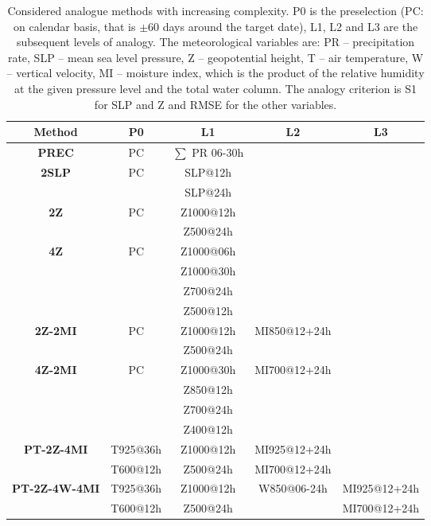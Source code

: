 \documentclass[twocol]{ametsoc}
\begin{document}
\begin{table*}[t]
	\caption{Considered analogue methods with increasing complexity. P0 is the preselection (PC: on calendar basis, that is $\pm 60$ days around the target date), L1, L2 and L3 are the subsequent levels of analogy. The meteorological variables are: PR -- precipitation rate, SLP -- mean sea level pressure, Z -- geopotential height, T -- air temperature, W -- vertical velocity, MI -- moisture index, which is the product of the relative humidity at the given pressure level and the total water column. The analogy criterion is S1 for SLP and Z and RMSE for the other variables.}
	\begin{center}
		\begin{tabular}{ccccc}
			\hline
			\textbf{Method} & \textbf{P0} & \textbf{L1} & \textbf{L2} & \textbf{L3} \\ 
			\hline 
			\textbf{PREC} & PC & $\sum$ PR 06-30h && \\
			\hline 
			\multirow{2}{*}{\textbf{2SLP}} & \multirow{2}{*}{PC} & SLP@12h && \\
			&& SLP@24h && \\
			\hline 
			\multirow{2}{*}{\textbf{2Z}} & \multirow{2}{*}{PC} & Z1000@12h && \\
			 && Z500@24h && \\
	 		\hline 
			\multirow{4}{*}{\textbf{4Z}} & \multirow{4}{*}{PC} & Z1000@06h && \\
			 && Z1000@30h && \\
			 && Z700@24h && \\
			 && Z500@12h && \\
			\hline 
			\multirow{2}{*}{\textbf{2Z-2MI}} & \multirow{2}{*}{PC} & Z1000@12h & \multirow{2}{*}{MI850@12+24h} & \\
			&& Z500@24h && \\
			\hline 
			\multirow{4}{*}{\textbf{4Z-2MI}} & \multirow{4}{*}{PC} & Z1000@30h & \multirow{4}{*}{MI700@12+24h} & \\
			&& Z850@12h && \\
			&& Z700@24h && \\
			&& Z400@12h && \\
			\hline 
			\multirow{2}{*}{\textbf{PT-2Z-4MI}} & T925@36h & Z1000@12h & MI925@12+24h & \\
			& T600@12h & Z500@24h & MI700@12+24h & \\
			\hline 
			\multirow{2}{*}{\textbf{PT-2Z-4W-4MI}} & T925@36h & Z1000@12h & \multirow{2}{*}{W850@06-24h} & MI925@12+24h \\
			& T600@12h & Z500@24h && MI700@12+24h \\
			\hline 
			
		\end{tabular} 
	\end{center}
	\label{table:methods}
\end{table*}
\end{document}
